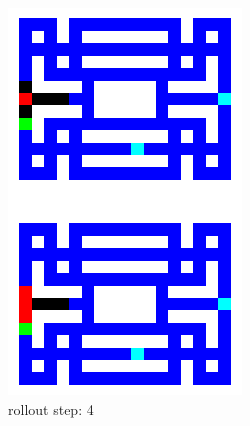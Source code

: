 \begin{figure}[H]
\begin{subfigure}[b]{0.16\textwidth}
        \includegraphics[width=\textwidth]{./Images/env_model_rollout_4.png}
  		\caption*{\footnotesize rollout step: 4} 
  		\label{fig:rollout_4}
    \end{subfigure} 
    \hspace{0mm}%
    \begin{subfigure}[b]{0.16\textwidth}

\end{subfigure}
\end{figure}
